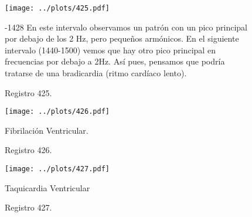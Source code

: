 \documentclass{article}
\begin{document}
\begin{figure}[h]
\texttt{[image: ../plots/425.pdf]}
\caption{Registro 425.}
-1428 En este intervalo observamos un patrón con un pico
principal por debajo de los 2 Hz, pero pequeños armónicos. En
el siguiente intervalo (1440-1500) vemos que hay otro pico
principal en frecuencias por debajo a 2Hz. Así pues, pensamos
que podría tratarse de una bradicardia (ritmo cardíaco lento).
\end{figure}

\begin{figure}[h]
\texttt{[image: ../plots/426.pdf]}
\caption{Registro 426.}
\quad Fibrilación Ventricular.
\end{figure}

\begin{figure}[h]
\texttt{[image: ../plots/427.pdf]}
\caption{Registro 427.}
\quad Taquicardia Ventricular
\end{figure}
\end{document}
